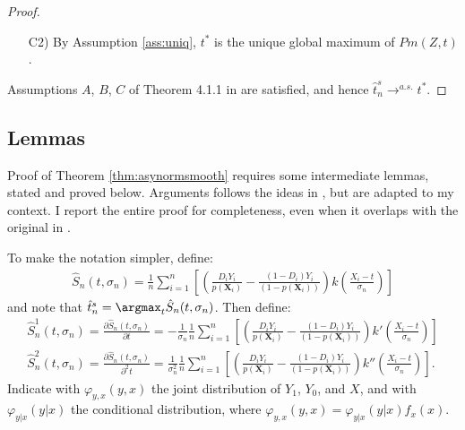 {\begin{proof}
\begin{itemize}
To show uniform convergence of $P m^s(\cdot, t)$ to $P m(Z, t)$, note that $t\in \mathcal{T}$, where $\mathcal{T}$ is bounded, and hence the result holds for $\sigma_n \rightarrow 0$.
\item[C2)] By Assumption \ref{ass:uniq}, $t^*$ is the unique global maximum of $P m(Z,t)$.
\end{itemize}

Assumptions $A$, $B$, $C$ of Theorem 4.1.1 in \cite{amemiya1985advanced} are satisfied, and hence $\hat{t}^s_n \rightarrow^{a.s.} t^*$.
\end{proof}

\subsection*{Lemmas}
\setcounter{thm}{0}
Proof of Theorem \ref{thm:asynormsmooth} requires some intermediate lemmas, stated and proved below. Arguments follows the ideas in \cite{horowitz1992smoothed}, but are adapted to my context. I report the entire proof for completeness, even when it overlaps with the original in \cite{horowitz1992smoothed}.

To make the notation simpler, define:
\begin{gather*}
    \hat{S}_n(t,\sigma_n) =  \frac{1}{n} \sum_{i=1}^n \left[\left(\frac{D_i Y_i}{p(\textbf{X}_i)} - \frac{(1-D_i) Y_i}{(1-p(\textbf{X}_i))} \right) k\left(\frac{X_i - t}{\sigma_n} \right) \right]
\end{gather*}
and note that $\hat{t}^s_n=\argmax_{t} \hat{S}_n(t,\sigma_n)$. Then define:
\begin{gather*}
    \hat{S}_n^1(t,\sigma_n) = \frac{\partial \hat{S}_n(t,\sigma_n)}{ \partial t} = - \frac{1}{\sigma_n} \frac{1}{n} \sum_{i=1}^n \left[\left(\frac{D_i Y_i}{p(\textbf{X}_i)} - \frac{(1-D_i) Y_i}{(1-p(\textbf{X}_i))} \right) k'\left(\frac{X_i - t}{\sigma_n} \right) \right]\\
    \hat{S}_n^2(t,\sigma_n) = \frac{\partial \hat{S}_n(t,\sigma_n)}{ \partial^2 t} = \frac{1}{\sigma_n^2} \frac{1}{n} \sum_{i=1}^n \left[\left(\frac{D_i Y_i}{p(\textbf{X}_i)} - \frac{(1-D_i) Y_i}{(1-p(\textbf{X}_i))} \right) k''\left(\frac{X_i - t}{\sigma_n} \right) \right].
\end{gather*}
Indicate with $\varphi_{y,x}(y,x)$ the joint distribution of $Y_1$, $Y_0$, and $X$, and with $\varphi_{y|x}(y|x)$ the conditional distribution, where $\varphi_{y,x}(y,x) = \varphi_{y|x}(y|x) f_x(x)$.

}
